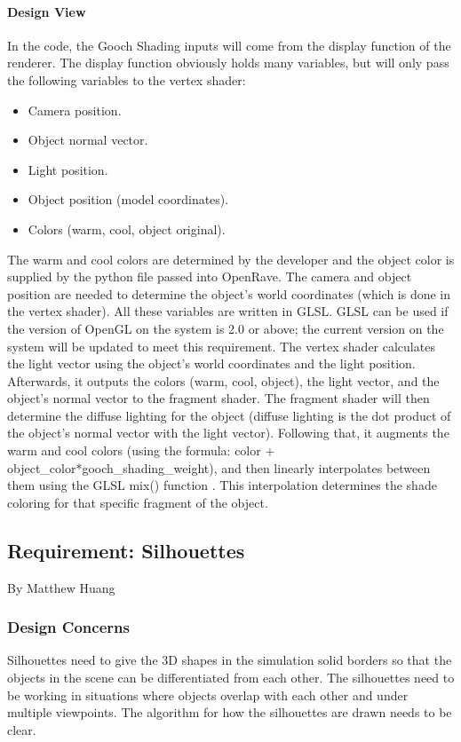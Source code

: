 \begin{flushleft}
\paragraph{Design View}
In the code, the Gooch Shading inputs will come from the display function of the renderer.
The display function obviously holds many variables, but will only pass the following variables to the vertex shader:
\begin{itemize}
\item Camera position.
\item Object normal vector.
\item Light position.
\item Object position (model coordinates).
\item Colors (warm, cool, object original).
\end{itemize}

The warm and cool colors are determined by the developer and the object color is supplied by the python file passed into OpenRave.
The camera and object position are needed to determine the object's world coordinates (which is done in the vertex shader).
All these variables are written in GLSL.
GLSL can be used if the version of OpenGL on the system is 2.0 or above; the current version on the system will be updated to meet this requirement.
The vertex shader calculates the light vector using the object's world coordinates and the light position. 
Afterwards, it outputs the colors (warm, cool, object), the light vector, and the object's normal vector to the fragment shader.
The fragment shader will then determine the diffuse lighting for the object (diffuse lighting is the dot product of the object's normal vector with the light vector).
Following that, it augments the warm and cool colors (using the formula: color + object\_color*gooch\_shading\_weight), and then linearly interpolates between them using the GLSL mix() function \cite{glslmix}.
This interpolation determines the shade coloring for that specific fragment of the object.

\newpage

\subsection{Requirement: Silhouettes}
\large{By Matthew Huang}

\normalsize
\subsubsection{Design Concerns}
Silhouettes need to give the 3D shapes in the simulation solid borders so that the objects in the scene can be differentiated from each other.
The silhouettes need to be working in situations where objects overlap with each other and under multiple viewpoints. 
The algorithm for how the silhouettes are drawn needs to be clear.


\end{flushleft}
